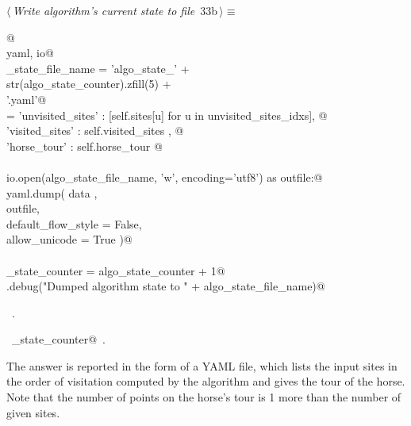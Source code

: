 \documentclass[11.5pt]{report}
\begin{document}
\begin{flushleft} \small\label{scrap26}\raggedright\small
{} $\langle\,${\itshape Write algorithm's current state to file}\nobreak\ {\footnotesize {33b}}$\,\rangle\equiv$
\vspace{-1ex}
\begin{list}{}{} \item
\mbox{}\verb@   @\\
\mbox{}\verb@import yaml, io@\\
\mbox{}\verb@algo_state_file_name = 'algo_state_' + \@\\
\mbox{}\verb@                       str(algo_state_counter).zfill(5) + \@\\
\mbox{}\verb@                       '.yaml'@\\
\mbox{}\verb@data = {'unvisited_sites' : [self.sites[u] for u in unvisited_sites_idxs], @\\
\mbox{}\verb@        'visited_sites'   : self.visited_sites , @\\
\mbox{}\verb@        'horse_tour'      : self.horse_tour }@\\
\mbox{}\verb@@\\
\mbox{}\verb@with io.open(algo_state_file_name, 'w', encoding='utf8') as outfile:@\\
\mbox{}\verb@     yaml.dump( data   , \@\\
\mbox{}\verb@                outfile, \@\\
\mbox{}\verb@                default_flow_style = False, \@\\
\mbox{}\verb@                allow_unicode      = True )@\\
\mbox{}\verb@@\\
\mbox{}\verb@algo_state_counter = algo_state_counter + 1@\\
\mbox{}\verb@logger.debug("Dumped algorithm state to " + algo_state_file_name)@\\
\mbox{}\verb@@{\NWsep}
\end{list}
\vspace{-1.5ex}
\footnotesize
\begin{list}{}{\setlength{\itemsep}{-\parsep}\setlength{\itemindent}{-\leftmargin}}
\item \NWtxtMacroRefIn\ .
\item \NWtxtIdentsUsed\nobreak\  \verb@algo_state_counter@\nobreak\ .
\item{}
\end{list}
\vspace{4ex}
\end{flushleft}
\newchunk The answer is reported in the form of a YAML file, which lists the input sites 
in the order of visitation computed by the algorithm and gives the tour of the horse. 
Note that the number of points on the horse's tour is 1 more than the number of given sites. 
\end{document}
